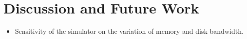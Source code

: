 \documentclass[conference]{IEEEtran}
\begin{document}
	\section{Discussion and Future Work}
		\begin{itemize}
			\item Sensitivity of the simulator on the variation of memory and disk bandwidth. 
		\end{itemize}


\end{document}
